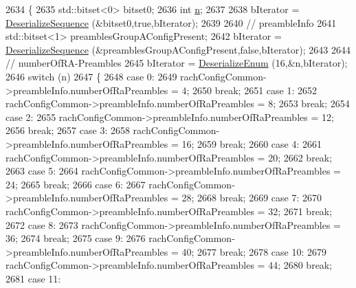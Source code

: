 \begin{DoxyCode}
2634 \{
2635   std::bitset<0> bitset0;
2636   \textcolor{keywordtype}{int} \hyperlink{namespacesample-rng-plot_aeb5ee5c431e338ef39b7ac5431242e1d}{n};
2637 
2638   bIterator = \hyperlink{classns3_1_1Asn1Header_a58c68bb97ba3fe2e8fcdd7c208d672b2}{DeserializeSequence} (&bitset0,\textcolor{keyword}{true},bIterator);
2639 
2640   \textcolor{comment}{// preambleInfo}
2641   std::bitset<1> preamblesGroupAConfigPresent;
2642   bIterator = \hyperlink{classns3_1_1Asn1Header_a58c68bb97ba3fe2e8fcdd7c208d672b2}{DeserializeSequence} (&preamblesGroupAConfigPresent,\textcolor{keyword}{false},bIterator);
2643 
2644   \textcolor{comment}{// numberOfRA-Preambles}
2645   bIterator = \hyperlink{classns3_1_1Asn1Header_a4fcc253e0eec3483c775b005c1875f2d}{DeserializeEnum} (16,&n,bIterator);
2646   \textcolor{keywordflow}{switch} (n)
2647     \{
2648     \textcolor{keywordflow}{case} 0:
2649       rachConfigCommon->preambleInfo.numberOfRaPreambles = 4;
2650       \textcolor{keywordflow}{break};
2651     \textcolor{keywordflow}{case} 1:
2652       rachConfigCommon->preambleInfo.numberOfRaPreambles = 8;
2653       \textcolor{keywordflow}{break};
2654     \textcolor{keywordflow}{case} 2:
2655       rachConfigCommon->preambleInfo.numberOfRaPreambles = 12;
2656       \textcolor{keywordflow}{break};
2657     \textcolor{keywordflow}{case} 3:
2658       rachConfigCommon->preambleInfo.numberOfRaPreambles = 16;
2659       \textcolor{keywordflow}{break};
2660     \textcolor{keywordflow}{case} 4:
2661       rachConfigCommon->preambleInfo.numberOfRaPreambles = 20;
2662       \textcolor{keywordflow}{break};
2663     \textcolor{keywordflow}{case} 5:
2664       rachConfigCommon->preambleInfo.numberOfRaPreambles = 24;
2665       \textcolor{keywordflow}{break};
2666     \textcolor{keywordflow}{case} 6:
2667       rachConfigCommon->preambleInfo.numberOfRaPreambles = 28;
2668       \textcolor{keywordflow}{break};
2669     \textcolor{keywordflow}{case} 7:
2670       rachConfigCommon->preambleInfo.numberOfRaPreambles = 32;
2671       \textcolor{keywordflow}{break};
2672     \textcolor{keywordflow}{case} 8:
2673       rachConfigCommon->preambleInfo.numberOfRaPreambles = 36;
2674       \textcolor{keywordflow}{break};
2675     \textcolor{keywordflow}{case} 9:
2676       rachConfigCommon->preambleInfo.numberOfRaPreambles = 40;
2677       \textcolor{keywordflow}{break};
2678     \textcolor{keywordflow}{case} 10:
2679       rachConfigCommon->preambleInfo.numberOfRaPreambles = 44;
2680       \textcolor{keywordflow}{break};
2681     \textcolor{keywordflow}{case} 11:

\end{DoxyCode}
